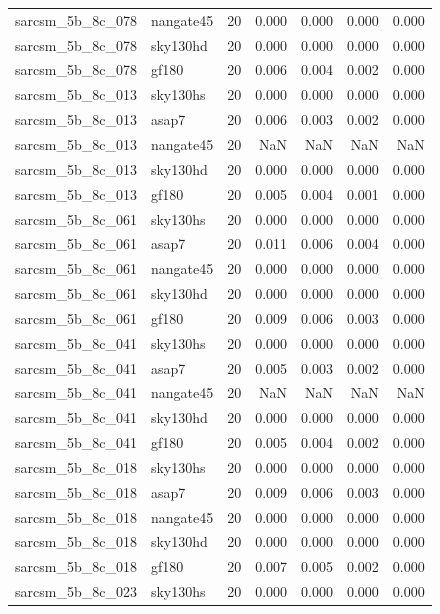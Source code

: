 \begin{tabular}{llrrrrr}
sarcsm\_5b\_8c\_078 & nangate45 & 20 & 0.000 & 0.000 & 0.000 & 0.000 \\
sarcsm\_5b\_8c\_078 & sky130hd & 20 & 0.000 & 0.000 & 0.000 & 0.000 \\
sarcsm\_5b\_8c\_078 & gf180 & 20 & 0.006 & 0.004 & 0.002 & 0.000 \\
sarcsm\_5b\_8c\_013 & sky130hs & 20 & 0.000 & 0.000 & 0.000 & 0.000 \\
sarcsm\_5b\_8c\_013 & asap7 & 20 & 0.006 & 0.003 & 0.002 & 0.000 \\
sarcsm\_5b\_8c\_013 & nangate45 & 20 & NaN & NaN & NaN & NaN \\
sarcsm\_5b\_8c\_013 & sky130hd & 20 & 0.000 & 0.000 & 0.000 & 0.000 \\
sarcsm\_5b\_8c\_013 & gf180 & 20 & 0.005 & 0.004 & 0.001 & 0.000 \\
sarcsm\_5b\_8c\_061 & sky130hs & 20 & 0.000 & 0.000 & 0.000 & 0.000 \\
sarcsm\_5b\_8c\_061 & asap7 & 20 & 0.011 & 0.006 & 0.004 & 0.000 \\
sarcsm\_5b\_8c\_061 & nangate45 & 20 & 0.000 & 0.000 & 0.000 & 0.000 \\
sarcsm\_5b\_8c\_061 & sky130hd & 20 & 0.000 & 0.000 & 0.000 & 0.000 \\
sarcsm\_5b\_8c\_061 & gf180 & 20 & 0.009 & 0.006 & 0.003 & 0.000 \\
sarcsm\_5b\_8c\_041 & sky130hs & 20 & 0.000 & 0.000 & 0.000 & 0.000 \\
sarcsm\_5b\_8c\_041 & asap7 & 20 & 0.005 & 0.003 & 0.002 & 0.000 \\
sarcsm\_5b\_8c\_041 & nangate45 & 20 & NaN & NaN & NaN & NaN \\
sarcsm\_5b\_8c\_041 & sky130hd & 20 & 0.000 & 0.000 & 0.000 & 0.000 \\
sarcsm\_5b\_8c\_041 & gf180 & 20 & 0.005 & 0.004 & 0.002 & 0.000 \\
sarcsm\_5b\_8c\_018 & sky130hs & 20 & 0.000 & 0.000 & 0.000 & 0.000 \\
sarcsm\_5b\_8c\_018 & asap7 & 20 & 0.009 & 0.006 & 0.003 & 0.000 \\
sarcsm\_5b\_8c\_018 & nangate45 & 20 & 0.000 & 0.000 & 0.000 & 0.000 \\
sarcsm\_5b\_8c\_018 & sky130hd & 20 & 0.000 & 0.000 & 0.000 & 0.000 \\
sarcsm\_5b\_8c\_018 & gf180 & 20 & 0.007 & 0.005 & 0.002 & 0.000 \\
sarcsm\_5b\_8c\_023 & sky130hs & 20 & 0.000 & 0.000 & 0.000 & 0.000 \\

\end{tabular}
